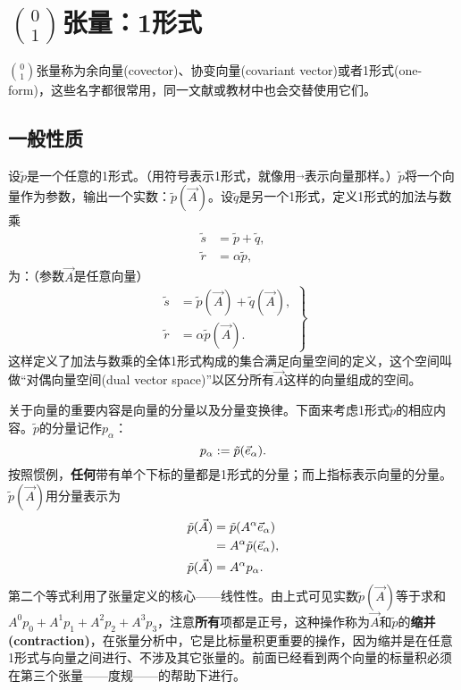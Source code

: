 \section{$\binom{0}{1}$张量：1形式}
\label{sec3.3}
$\binom{0}{1}$张量称为余向量(covector)、协变向量(covariant vector)或者1形式(one-form)，这些名字都很常用，同一文献或教材中也会交替使用它们。

\subsection*{一般性质}
设$\tilde{p}$是一个任意的1形式。（用符号$\tilde{ }$表示1形式，就像用$\vec{ }$表示向量那样。）$\tilde{p}$将一个向量作为参数，输出一个实数：$\tilde{p} (\vec{A})$。设$\tilde{q}$是另一个1形式，定义1形式的加法与数乘
\begin{align*}
    \tilde{s} &= \tilde{p} + \tilde{q}, \\
    \tilde{r} &= \alpha \tilde{p},
\end{align*}
为：（参数$\vec{A}$是任意向量）
\begin{equation}
\left.
\begin{split}
    \tilde{s} &= \tilde{p} (\vec{A}) + \tilde{q} (\vec{A}), \\
    \tilde{r} &= \alpha \tilde{p} (\vec{A}).
\end{split}
\right\}
\label{equ3.6}
\end{equation}
这样定义了加法与数乘的全体1形式构成的集合满足向量空间的定义，这个空间叫做“对偶向量空间(dual vector space)”以区分所有$\vec{A}$这样的向量组成的空间。

关于向量的重要内容是向量的分量以及分量变换律。下面来考虑1形式$\tilde{p}$的相应内容。$\tilde{p}$的分量记作$p_\alpha$：
\begin{equation}
    p_\alpha := \tilde{p} (\vec{e}_\alpha).
\label{equ3.7}
\end{equation}
按照惯例，\textbf{任何}带有单个下标的量都是1形式的分量；而上指标表示向量的分量。$\tilde{p} (\vec{A})$用分量表示为
\begin{align}
    \tilde{p} (\vec{A}) &= \tilde{p} (A^\alpha \vec{e}_\alpha) \notag \\
    &= A^\alpha \tilde{p} (\vec{e}_\alpha), \notag \\
    \tilde{p} (\vec{A}) &= A^\alpha p_\alpha. \label{equ3.8}
\end{align}
第二个等式利用了张量定义的核心——线性性。由上式可见实数$\tilde{p} (\vec{A})$等于求和$A^0 p_0 + A^1 p_1 + A^2 p_2 + A^3 p_3$，注意\textbf{所有}项都是正号，这种操作称为$\vec{A}$和$\tilde{p}$的\textbf{缩并 (contraction)}，在张量分析中，它是比标量积更重要的操作，因为缩并是在任意1形式与向量之间进行、不涉及其它张量的。前面已经看到两个向量的标量积必须在第三个张量——度规——的帮助下进行。


